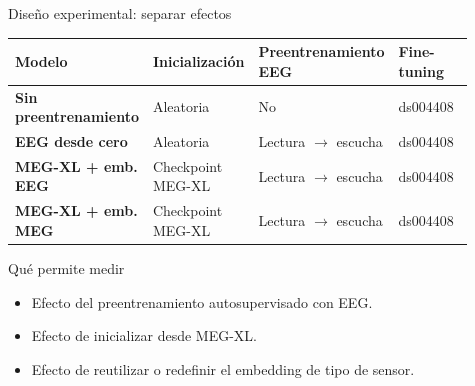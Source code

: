 \documentclass[aspectratio=169,10pt]{beamer}
\begin{document}
\begin{frame}[c]{Diseño experimental: separar efectos}
  \small
  \renewcommand{\arraystretch}{1.22}
  \setlength{\tabcolsep}{5pt}
  \begin{center}
  \begin{tabular}{>{\bfseries}p{0.25\linewidth}p{0.22\linewidth}p{0.26\linewidth}p{0.18\linewidth}}
    \toprule
    Modelo & Inicialización & Preentrenamiento EEG & Fine-tuning \\
    \midrule
    Sin preentrenamiento & Aleatoria & No & ds004408 \\
    EEG desde cero & Aleatoria & Lectura $\rightarrow$ escucha & ds004408 \\
    MEG-XL + emb. EEG & Checkpoint MEG-XL & Lectura $\rightarrow$ escucha & ds004408 \\
    MEG-XL + emb. MEG & Checkpoint MEG-XL & Lectura $\rightarrow$ escucha & ds004408 \\
    \bottomrule
  \end{tabular}
  \end{center}

  \vspace{3mm}

  \begin{block}{Qué permite medir}
    \begin{itemize}
      \item Efecto del preentrenamiento autosupervisado con EEG.
      \item Efecto de inicializar desde MEG-XL.
      \item Efecto de reutilizar o redefinir el embedding de tipo de sensor.
    \end{itemize}
  \end{block}

\end{frame}
\end{document}
